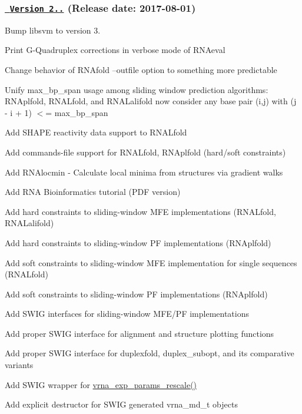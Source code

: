 \subsubsection*{\href{https://github.com/ViennaRNA/ViennaRNA/compare/v2.3.5...v2.4.0}{\texttt{ Version 2..}} (Release date\+: 2017-\/08-\/01)}


\begin{DoxyItemize}
\item Bump libsvm to version 3.
\item Print G-\/\+Quadruplex corrections in verbose mode of R\+N\+Aeval
\item Change behavior of R\+N\+Afold --outfile option to something more predictable
\item Unify max\+\_\+bp\+\_\+span usage among sliding window prediction algorithms\+: R\+N\+Aplfold, R\+N\+A\+Lfold, and R\+N\+A\+Lalifold now consider any base pair (i,j) with (j -\/ i + 1) $<$= max\+\_\+bp\+\_\+span
\item Add S\+H\+A\+PE reactivity data support to R\+N\+A\+Lfold
\item Add commands-\/file support for R\+N\+A\+Lfold, R\+N\+Aplfold (hard/soft constraints)
\item Add R\+N\+Alocmin -\/ Calculate local minima from structures via gradient walks
\item Add R\+NA Bioinformatics tutorial (P\+DF version)
\item Add hard constraints to sliding-\/window M\+FE implementations (R\+N\+A\+Lfold, R\+N\+A\+Lalifold)
\item Add hard constraints to sliding-\/window PF implementations (R\+N\+Aplfold)
\item Add soft constraints to sliding-\/window M\+FE implementation for single sequences (R\+N\+A\+Lfold)
\item Add soft constraints to sliding-\/window PF implementations (R\+N\+Aplfold)
\item Add S\+W\+IG interfaces for sliding-\/window M\+F\+E/\+PF implementations
\item Add proper S\+W\+IG interface for alignment and structure plotting functions
\item Add proper S\+W\+IG interface for duplexfold, duplex\+\_\+subopt, and its comparative variants
\item Add S\+W\+IG wrapper for \mbox{\hyperlink{group__energy__parameters_gad607bc3a5b5da16400e2ca4ea5560233}{vrna\+\_\+exp\+\_\+params\+\_\+rescale()}}
\item Add explicit destructor for S\+W\+IG generated vrna\+\_\+md\+\_\+t objects

\end{DoxyItemize}
